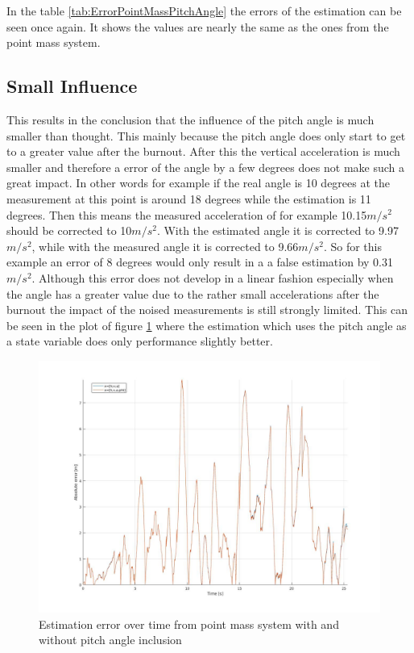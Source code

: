 In the table \ref{tab:ErrorPointMassPitchAngle} the errors of the estimation can be seen once again.
It shows the values are nearly the same as the ones from the point mass system.

\subsection{Small Influence}
This results in the conclusion that the influence of the pitch angle is much smaller than thought.
This mainly because the pitch angle does only start to get to a greater value after the burnout.
After this the vertical acceleration is much smaller and therefore a error of the angle by a few degrees does not make such a great impact.
In other words for example if the real angle is 10 degrees at the measurement at this point is around 18 degrees while the estimation is 11 degrees.
Then this means the measured acceleration of for example 10.15$m/s^2$ should be corrected to 10$m/s^2$. With the estimated angle it is corrected to 9.97$m/s^2$,
while with the measured angle it is corrected to 9.66$m/s^2$. So for this example an error of 8 degrees would only result in a a false estimation by 0.31$m/s^2$.
Although this error does not develop in a linear fashion especially when the angle has a greater value due to the rather small accelerations after the burnout the impact of the noised measurements is still strongly limited.
This can be seen in the plot of figure \ref{fig:PointMassVSPitch} where the estimation which uses the pitch angle as a state variable does only performance slightly better.
\begin{figure}[h!]
 \centering
 \includegraphics[width=.8 \textwidth]{./Pictures/PointMassVSPitch.jpg}
 \caption{Estimation error over time from point mass system with and without pitch angle inclusion}
 \label{fig:PointMassVSPitch}
\end{figure}


